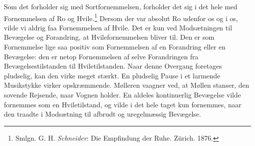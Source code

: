 \documentclass[12pt,a4paper,openany]{book}
\newcommand{\opage}[1]{\marginnote{\footnotesize\textit{[#1]}}}
\begin{document}
Som det forholder sig med Sortfornemmelsen, forholder det sig i det hele
med Fornemmelsen af Ro og Hvile.\footnote[3]{Smlgn. G. H.
\emph{Schneider}: Die Empfindung der Ruhe. Zürich. 1876.} Dersom der var
absolut Ro udenfor os og i os, vilde vi aldrig faa Fornemmelsen af
Hvile. Det er kun ved Modsætningen til Bevægelse og Forandring, at
Hvilefornemmelsen bliver til. Den er som Fornemmelse lige saa positiv
som Fornemmelsen af en Forandring eller en Bevægelse: den er netop
Fornemmelsen af selve Forandringen fra Bevægelsestilstanden til
Hviletilstanden. Naar denne Overgang foretages pludselig, kan den virke
meget stærkt. En pludselig Pause i et larmende Musikstykke virker
opskræmmende. Mølleren vaagner ved, at Møllen stanser, den sovende
Rejsende, naar Vognen holder. En aldeles
\opage{138}kontinuerlig Bevægelse vilde fornemmes som en Hviletilstand,
og vilde i det hele taget kun fornemmes, naar den traadte i Modsætning
til afbrudt og uregelmæssig Bevægelse.
\end{document}
